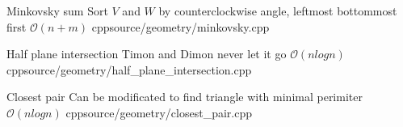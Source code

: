 \documentclass[landscape, 10pt, a4paper, oneside, twocolumn]{extarticle}
\begin{document}
\Algorithm
{Minkovsky sum}
{Sort $V$ and $W$ by counterclockwise angle, leftmost bottommost first}
{$\mathcal{O}(n + m)$}
{cpp}{source/geometry/minkovsky.cpp}

\Algorithm
{Half plane intersection}
{Timon and Dimon never let it go}
{$\mathcal{O}(n logn)$}
{cpp}{source/geometry/half_plane_intersection.cpp}

\Algorithm
{Closest pair}
{Can be modificated to find triangle with minimal perimiter}
{$\mathcal{O}(n logn)$}
{cpp}{source/geometry/closest_pair.cpp}

\end{document}
